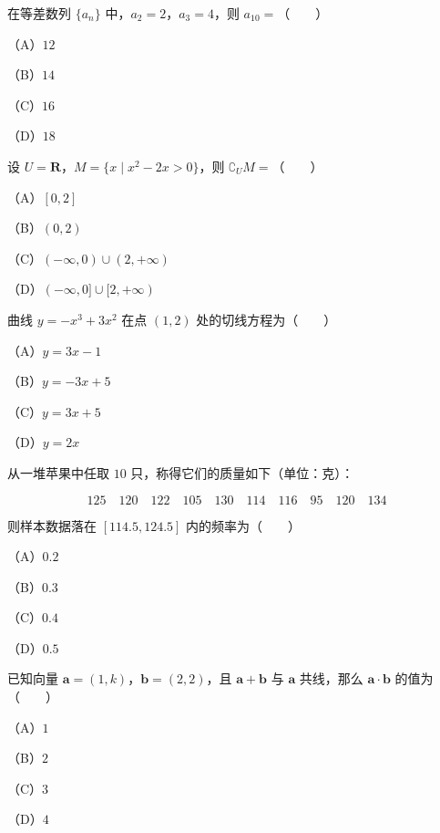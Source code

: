 

\begin{question}
在等差数列 $\{a_n\}$ 中，$a_2=2$，$a_3=4$，则 $a_{10}=$\mbox{（　　）}

（A）$12$

（B）$14$

（C）$16$

（D）$18$

\end{question}
\begin{question}
设 $U=\mathbf R$，$M=\{x\mid x^2-2x>0\}$，则 $\complement_U M=$\mbox{（　　）}

（A）$[0,2]$

（B）$(0,2)$

（C）$(-\infty,0)\cup(2,+\infty)$

（D）$(-\infty,0]\cup[2,+\infty)$

\end{question}
\begin{question}
曲线 $y=-x^3+3x^2$ 在点 $(1,2)$ 处的切线方程为\mbox{（　　）}

（A）$y=3x-1$

（B）$y=-3x+5$

（C）$y=3x+5$

（D）$y=2x$

\end{question}
\begin{question}
从一堆苹果中任取 $10$ 只，称得它们的质量如下（单位：克）：

\nopagebreak[4]
\[125\quad120\quad122\quad105\quad130\quad114\quad116\quad95\quad120\quad134\]

则样本数据落在 $[114.5,124.5]$ 内的频率为\mbox{（　　）}

（A）$0.2$

（B）$0.3$

（C）$0.4$

（D）$0.5$

\end{question}
\begin{question}
已知向量 $\boldsymbol a=(1,k)$，$\boldsymbol b=(2,2)$，且 $\boldsymbol a+\boldsymbol b$ 与 $\boldsymbol a$ 共线，那么 $\boldsymbol a\cdot\boldsymbol b$ 的值为\mbox{（　　）}

（A）$1$

（B）$2$

（C）$3$

（D）$4$

\end{question}
